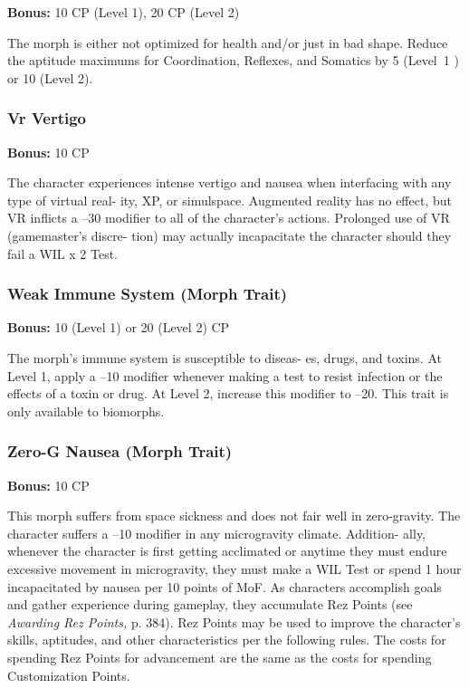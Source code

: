 \textbf{Bonus:} 10 CP (Level 1), 20 CP (Level 2)

The morph is either not optimized for health and/or 
just in bad shape. Reduce the aptitude maximums for 
Coordination, Reflexes, and Somatics by 5 (Level 1 ) 
or 10 (Level 2).

\subsubsection{Vr Vertigo}

\textbf{Bonus:} 10 CP

The character experiences intense vertigo and 
nausea when interfacing with any type of virtual real-
ity, XP, or simulspace. Augmented reality has no effect, 
but VR inflicts a –30 modifier to all of the character's 
actions. Prolonged use of VR (gamemaster's discre-
tion) may actually incapacitate the character should 
they fail a WIL x 2 Test.

\subsubsection{Weak Immune System (Morph Trait)}

\textbf{Bonus:} 10 (Level 1) or 20 (Level 2) CP

The morph's immune system is susceptible to diseas-
es, drugs, and toxins. At Level 1, apply a –10 modifier 
whenever making a test to resist infection or the effects 
of a toxin or drug. At Level 2, increase this modifier to 
–20. This trait is only available to biomorphs.

\subsubsection{Zero-G Nausea (Morph Trait)}

\textbf{Bonus:} 10 CP

This morph suffers from space sickness and does 
not fair well in zero-gravity. The character suffers a 
–10 modifier in any microgravity climate. Addition-
ally, whenever the character is first getting acclimated 
or anytime they must endure excessive movement in 
microgravity, they must make a WIL Test or spend 1 
hour incapacitated by nausea per 10 points of MoF.
As characters accomplish goals and gather experience 
during gameplay, they accumulate Rez Points (see 
\textit{Awarding Rez Points,} p. 384). Rez Points may be used 
to improve the character's skills, aptitudes, and other 
characteristics per the following rules. The costs for 
spending Rez Points for advancement are the same as 
the costs for spending Customization Points.

